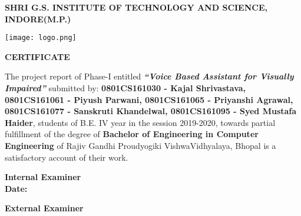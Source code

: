 \pagestyle{plain}
\large
\begin{center}
    


\textbf{SHRI G.S. INSTITUTE OF TECHNOLOGY AND SCIENCE, INDORE(M.P.)\\}

\vspace*{0.7cm}

\texttt{[image: logo.png]}

\vspace*{0.7cm}
\normalfont\LARGE\centering
\textbf{CERTIFICATE} \\
\end{center}
\normalsize
The project report of Phase-I entitled \emph{\textbf{``Voice Based Assistant for Visually Impaired''}} submitted by:
\textbf{
0801CS161030 - Kajal Shrivastava,
0801CS161061 - Piyush Parwani, 
0801CS161065 - Priyanshi Agrawal, 
0801CS161077 - Sanskruti Khandelwal, 
0801CS161095 - Syed Mustafa Haider}, students of B.E. IV year in the session 2019-2020, towards partial fulfillment of the degree of \textbf{Bachelor of Engineering in Computer Engineering} of Rajiv Gandhi Proudyogiki VishwaVidhyalaya, Bhopal is a satisfactory account of their work.



\begin{minipage}[t]{0.45\textwidth}
    \flushleft
    \vspace*{3cm}
    \large
    \textbf{Internal Examiner\\}
    \vspace*{1.5cm}
    \textbf{Date:}
\end{minipage}
\hfill
\begin{minipage}[t]{0.45\textwidth}
    \flushleft
    \vspace*{3cm}
    \large
    \textbf{External Examiner}
  
\end{minipage}